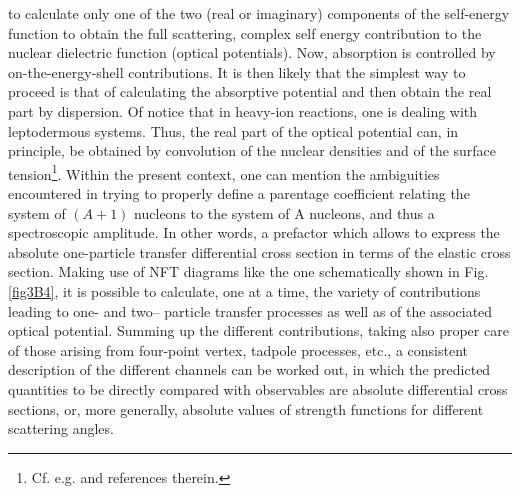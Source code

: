 to calculate only one of the two (real or imaginary)
components of the self-energy function to obtain the
full scattering, complex self energy contribution to the nuclear dielectric function
(optical potentials). Now, absorption is controlled
by on-the-energy-shell contributions. It is then likely that the simplest way to proceed is
that of calculating the absorptive potential and then
obtain the real part by dispersion. Of notice that in heavy-ion reactions,
one is dealing with leptodermous systems. Thus, the
real part of the optical potential can, in principle, be
obtained by convolution of the nuclear densities and
of the surface tension\footnote{Cf. e.g. \cite{Broglia:04a} and references therein.}. Within the present context, one can mention the
ambiguities encountered in trying to properly define
a parentage coefficient relating the system of $(A +
1)$ nucleons to the system of A nucleons, and thus
a spectroscopic amplitude. In other words, a prefactor which allows to express the absolute one-particle transfer differential
cross section in terms of the elastic cross section.
Making use of NFT diagrams like the one schematically shown
in Fig. \ref{fig3B4}, it is possible to calculate, one at a time,
the variety of contributions leading to one- and two-- particle
transfer processes as well as of the associated optical potential. Summing up the different
contributions, taking also proper care of those arising
from four-point vertex, tadpole processes, etc., a
consistent description of the different channels can be
worked out, in which the predicted quantities to be
directly compared with observables are absolute differential
cross sections, or, more generally, absolute
values of strength functions for different scattering
angles.
